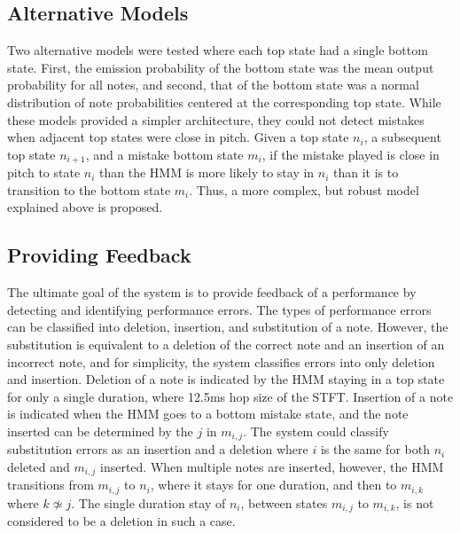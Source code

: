 \documentclass[twocolumn]{article}
\begin{document}
\subsection{Alternative Models}

Two alternative models were tested where each top state had a single bottom state. First, the emission probability of the bottom state was the mean output probability for all notes, and second, that of the bottom state was a normal distribution of note probabilities centered at the corresponding top state. While these models provided a simpler architecture, they could not detect mistakes when adjacent top states were close in pitch. Given a top state $n_i$, a subsequent top state $n_{i+1}$, and a mistake bottom state $m_i$, if the mistake played is close in pitch to state $n_i$ than the HMM is more likely to stay in $n_i$ than it is to transition to the bottom state $m_i$. Thus, a more complex, but robust model explained above is proposed.

\subsection{Providing Feedback}

The ultimate goal of the system is to provide feedback of a performance by detecting and identifying performance errors. The types of performance errors can be classified into deletion, insertion, and substitution of a note. However, the substitution is equivalent to a deletion of the correct note and an insertion of an incorrect note, and for simplicity, the system classifies errors into only deletion and insertion. Deletion of a note is indicated by the HMM staying in a top state for only a single duration, where 12.5ms hop size of the STFT. Insertion of a note is indicated when the HMM goes to a bottom mistake state, and the note inserted can be determined by the $j$ in $m_{i,j}$. The system could classify substitution errors as an insertion and a deletion where $i$ is the same for both $n_i$ deleted and $m_{i,j}$ inserted. When multiple notes are inserted, however, the HMM transitions from $m_{i,j}$ to $n_i$, where it stays for one duration, and then to $m_{i,k}$ where $k ≄ j$. The single duration stay of $n_i$, between states $m_{i,j}$ to $m_{i,k}$, is not considered to be a deletion in such a case.
\end{document}
